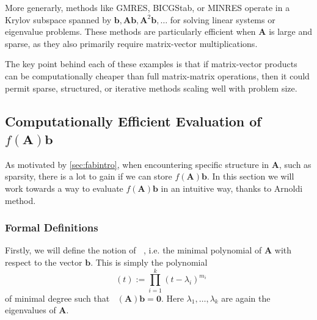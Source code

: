 \documentclass[11pt]{article}
\DeclareMathOperator{\phiAb}{\phi_{\mathbf{A},\mathbf{b}}}
\numberwithin{equation}{section}
\begin{document}
More generarly, methods like GMRES, BICGStab, or MINRES operate in a Krylov subspace spanned by ${\mathbf{b}, \mathbf{A}\mathbf{b}, \mathbf{A}^2\mathbf{b}, \ldots}$ for solving linear systems or eigenvalue problems. These methods are particularly efficient when $\mathbf{A}$ is large and sparse, as they also primarily require matrix-vector multiplications.

The key point behind each of these examples is that if matrix-vector products can be computationally cheaper than full matrix-matrix operations, then it could permit sparse, structured, or iterative methods scaling well with problem size.

\subsection{Computationally Efficient Evaluation of $f(\mathbf{A})\mathbf{b}$}
As motivated by \ref{sec:fabintro}, when encountering specific structure in $\mathbf{A}$, such as sparsity, there is a lot to gain if we can store $f(\mathbf{A})\mathbf{b}$. In this section we will work towards a way to evaluate $f(\mathbf{A})\mathbf{b}$ in an intuitive way, thanks to Arnoldi method.

\subsubsection{Formal Definitions}
Firstly, we will define the notion of $\phiAb$, i.e. the minimal polynomial of $\mathbf{A}$ with respect to the vector $\mathbf{b}$. This is simply the polynomial
\begin{equation}\label{eq:minPolyAb}
\phiAb(t):= \prod_{i=1}^{k}(t-\lambda_i)^{m_i}
\end{equation}
of minimal degree such that $\phiAb(\mathbf{A})\mathbf{b}=\mathbf{0}$. Here $\lambda_1,\ldots,\lambda_k$ are again the eigenvalues of $\mathbf{A}$.
\end{document}
